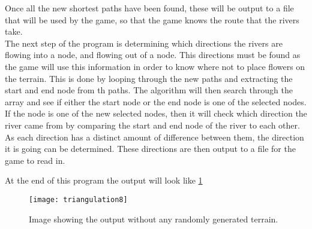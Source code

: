 	Once all the new shortest paths have been found, these will be output to a file that will be used by the game, so that the game knows the route that the rivers take.\\
	The next step of the program is determining which directions the rivers are flowing into a node, and flowing out of a node. This directions must be found as the game will use this information in order to know where not to place flowers on the terrain. This is done by looping through the new paths and extracting the start and end node from th paths. The algorithm will then search through the array and see if either the start node or the end node is one of the selected nodes. If the node is one of the new selected nodes, then it will check which direction the river came from by comparing the start and end node of the river to each other. As each direction has a distinct amount of difference between them, the direction it is going can be determined. These directions are then output to a file for the game to read in.


	At the end of this program the output will look like \ref{fig:triangulation8}

\begin{figure}[H]
	\texttt{[image: triangulation8]}
	\centering
	\caption{Image showing the output without any randomly generated terrain.}
	\label{fig:triangulation8}
\end{figure}

